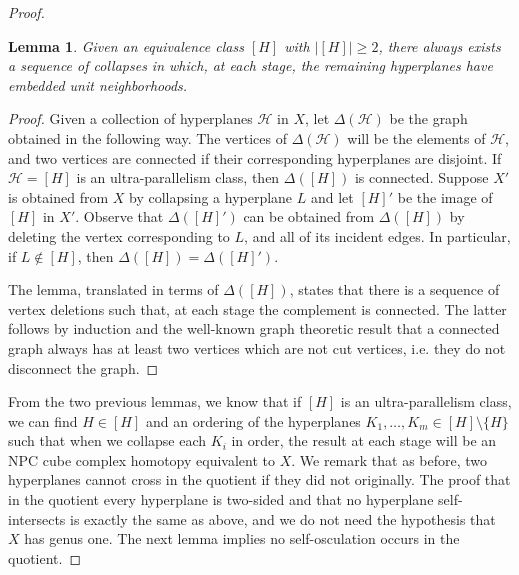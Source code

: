 \documentclass[11pt]{amsart}
\numberwithin{thm}{section}
\newtheorem{lemma}[thm]{Lemma}
\theoremstyle{remark}
\theoremstyle{definition}
\newcommand{\overl}[1]{\overline{#1}}
\begin{document}
\begin{proof}
\begin{lemma}\label{CollapseSequence}Given an equivalence class $[H]$ with $|[H]|\geq 2$, there always exists a sequence of collapses in which, at each stage, the remaining hyperplanes have embedded unit neighborhoods.  
\end{lemma}
\begin{proof} Given a collection of hyperplanes $\mathcal{H}$ in $X$, let $\Delta(\mathcal{H})$ be the graph obtained in the following way.  The vertices of $\Delta(\mathcal{H})$ will be the elements of $\mathcal{H}$, and two vertices are connected if their corresponding hyperplanes are disjoint.  If $\mathcal{H}=[H]$ is an ultra-parallelism class, then $\Delta([H])$ is connected. Suppose $X'$ is obtained from $X$ by collapsing a hyperplane $L$ and let $[H]'$ be the image of $[H]$ in $X'$.  Observe that $\Delta([H]')$ can be obtained from $\Delta([H])$ by deleting the vertex corresponding to $L$, and all of its incident edges.  In particular, if $L\notin[H]$, then $\Delta([H])=\Delta([H]')$.  

The lemma, translated in terms of $\Delta([H])$, states that there is a sequence of vertex deletions such that, at each stage the complement is connected.  The latter follows by induction and the well-known graph theoretic result that a connected graph always has at least two vertices which are not cut vertices, i.e. they do not disconnect the graph.  
\end{proof}

From the two previous lemmas, we know that if $[H]$ is an ultra-parallelism class, we can find $H\in [H]$ and an ordering of the hyperplanes $K_1,\ldots, K_m\in [H]\setminus\{H\}$ such that when we collapse each $K_i$ in order, the result at each stage will be an NPC cube complex homotopy equivalent to $X$.  We remark that as before, two hyperplanes cannot cross in the quotient if they did not originally.  The proof that in the quotient every hyperplane is two-sided and that no hyperplane self-intersects is exactly the same as above, and we do not need the hypothesis that $X$ has genus one.  The next lemma implies no self-osculation occurs in the quotient.  


\end{proof}
\end{document}
